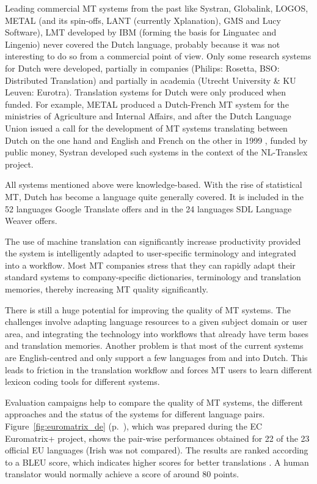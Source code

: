 \begin{multicols}{2}
    Leading commercial MT systems from the past like Systran, Globalink, LOGOS, METAL (and its spin-offs, LANT (currently Xplanation), GMS and Lucy Software), LMT developed by IBM (forming the basis for Linguatec  and Lingenio) never covered the Dutch language, probably because it was not interesting to do so from a commercial point of view. Only some research systems for Dutch were developed, partially in companies (Philips: Rosetta, BSO: Distributed Translation) and partially in academia (Utrecht University \& KU Leuven: Eurotra). Translation systems for Dutch were only produced when funded. For example, METAL produced a Dutch-French MT system for the ministries of Agriculture and Internal Affairs, and after the Dutch Language Union issued a call for the development of MT systems translating between Dutch on the one hand and English and French on the other in 1999 \cite{Cucchiarini:etal:2000},  funded by public money, Systran developed such systems in the context of the NL-Translex project.

    All systems mentioned above were knowledge-based. With the rise of statistical MT, Dutch has become a language quite generally covered. It is included in the 52 languages Google Translate offers and in the 24 languages SDL Language Weaver offers.

    The use of machine translation can significantly increase productivity provided the system is intelligently adapted to user-specific terminology and integrated into a workflow. Most MT companies stress that they can rapidly adapt their standard systems to company-specific dictionaries, terminology and translation memories, thereby increasing MT quality significantly.

There is still a huge potential for improving the quality of MT systems. The challenges involve adapting language resources to a given subject domain or user area, and integrating the technology into workflows that already have term bases and translation memories. Another problem is that most of the current systems are English-centred and only support a few languages from and into Dutch. This leads to friction in the translation workflow and forces MT users to learn different lexicon coding tools for different systems.

Evaluation campaigns help to compare the quality of MT systems, the different approaches and the status of the systems for different language pairs. Figure~\ref{fig:euromatrix_de} (p.~\pageref{fig:euromatrix_de}), which was prepared during the EC Euromatrix+ project, shows the pair-wise performances obtained for 22 of the 23 official EU languages (Irish was not compared). The results are ranked according to a BLEU score, which indicates higher scores for better translations \cite{bleu1}. A human translator would normally achieve a score of around 80 points.


\end{multicols}
